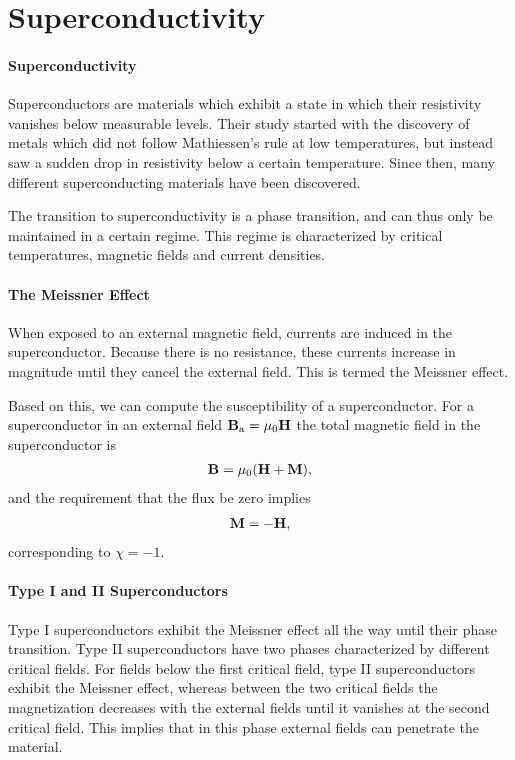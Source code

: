 \section{Superconductivity}

\paragraph{Superconductivity}
Superconductors are materials which exhibit a state in which their resistivity vanishes below measurable levels. Their study started with the discovery of metals which did not follow Mathiessen's rule at low temperatures, but instead saw a sudden drop in resistivity below a certain temperature. Since then, many different superconducting materials have been discovered.

The transition to superconductivity is a phase transition, and can thus only be maintained in a certain regime. This regime is characterized by critical temperatures, magnetic fields and current densities.

\paragraph{The Meissner Effect}
When exposed to an external magnetic field, currents are induced in the superconductor. Because there is no resistance, these currents increase in magnitude until they cancel the external field. This is termed the Meissner effect.

Based on this, we can compute the susceptibility of a superconductor. For a superconductor in an external field $\vb{B}_{\text{a}} = \mu_{0}\vb{H}$ the total magnetic field in the superconductor is
\begin{align*}
	\vb{B} = \mu_{0}(\vb{H} + \vb{M}),
\end{align*}
and the requirement that the flux be zero implies
\begin{align*}
	\vb{M} = -\vb{H},
\end{align*}
corresponding to $\chi = -1$.

\paragraph{Type I and II Superconductors}
Type I superconductors exhibit the Meissner effect all the way until their phase transition. Type II superconductors have two phases characterized by different critical fields. For fields below the first critical field, type II superconductors exhibit the Meissner effect, whereas between the two critical fields the magnetization decreases with the external fields until it vanishes at the second critical field. This implies that in this phase external fields can penetrate the material.

